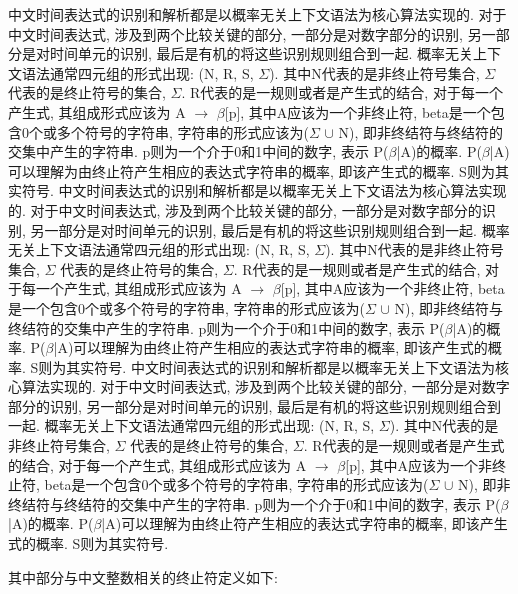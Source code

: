中文时间表达式的识别和解析都是以概率无关上下文语法为核心算法实现的.
对于中文时间表达式, 涉及到两个比较关键的部分, 一部分是对数字部分的识别, 另一部分是对时间单元的识别, 最后是有机的将这些识别规则组合到一起.
概率无关上下文语法通常四元组的形式出现: (N, R, S,  $\varSigma$). 其中N代表的是非终止符号集合, $\varSigma$ 代表的是终止符号的集合, $\varSigma$.
R代表的是一规则或者是产生式的结合, 对于每一个产生式, 其组成形式应该为 A $\rightarrow$ $\beta$[p], 其中A应该为一个非终止符, beta是一个包含0个或多个符号的字符串,
字符串的形式应该为($\varSigma$ $\cup$ N), 即非终结符与终结符的交集中产生的字符串. p则为一个介于0和1中间的数字, 表示 P($\beta$|A)的概率.
P($\beta$|A)可以理解为由终止符产生相应的表达式字符串的概率, 即该产生式的概率.
S则为其实符号.
中文时间表达式的识别和解析都是以概率无关上下文语法为核心算法实现的.
对于中文时间表达式, 涉及到两个比较关键的部分, 一部分是对数字部分的识别, 另一部分是对时间单元的识别, 最后是有机的将这些识别规则组合到一起.
概率无关上下文语法通常四元组的形式出现: (N, R, S,  $\varSigma$). 其中N代表的是非终止符号集合, $\varSigma$ 代表的是终止符号的集合, $\varSigma$.
R代表的是一规则或者是产生式的结合, 对于每一个产生式, 其组成形式应该为 A $\rightarrow$ $\beta$[p], 其中A应该为一个非终止符, beta是一个包含0个或多个符号的字符串,
字符串的形式应该为($\varSigma$ $\cup$ N), 即非终结符与终结符的交集中产生的字符串. p则为一个介于0和1中间的数字, 表示 P($\beta$|A)的概率.
P($\beta$|A)可以理解为由终止符产生相应的表达式字符串的概率, 即该产生式的概率.
S则为其实符号.
中文时间表达式的识别和解析都是以概率无关上下文语法为核心算法实现的.
对于中文时间表达式, 涉及到两个比较关键的部分, 一部分是对数字部分的识别, 另一部分是对时间单元的识别, 最后是有机的将这些识别规则组合到一起.
概率无关上下文语法通常四元组的形式出现: (N, R, S,  $\varSigma$). 其中N代表的是非终止符号集合, $\varSigma$ 代表的是终止符号的集合, $\varSigma$.
R代表的是一规则或者是产生式的结合, 对于每一个产生式, 其组成形式应该为 A $\rightarrow$ $\beta$[p], 其中A应该为一个非终止符, beta是一个包含0个或多个符号的字符串,
字符串的形式应该为($\varSigma$ $\cup$ N), 即非终结符与终结符的交集中产生的字符串. p则为一个介于0和1中间的数字, 表示 P($\beta$|A)的概率.
P($\beta$|A)可以理解为由终止符产生相应的表达式字符串的概率, 即该产生式的概率.
S则为其实符号.

其中部分与中文整数相关的终止符定义如下:

